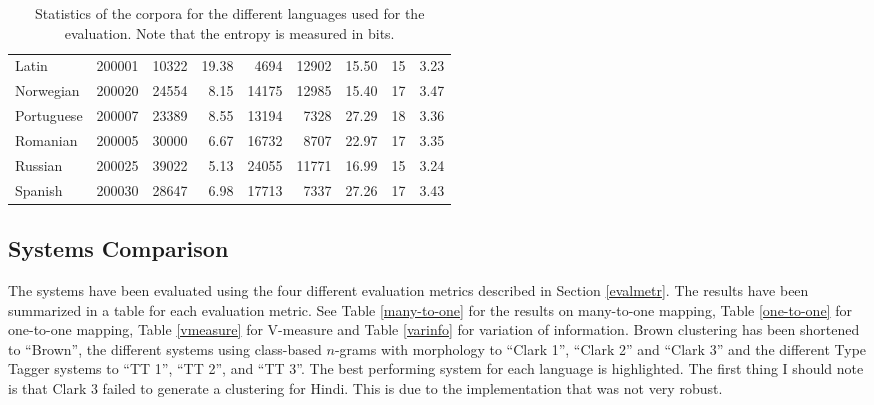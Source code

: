 \documentclass[11pt]{article}
\begin{document}
{\begin{table}
\begin{tabular}{l|r|r|r|r|r|r|r|r}
Latin&200001&10322&19.38&4694  &12902&15.50&15&3.23\\
Norwegian&200020&24554&8.15& 14175 &12985&15.40&17&3.47\\
Portuguese&200007&23389&8.55& 13194 &7328&27.29&18&3.36\\
Romanian&200005&30000&6.67& 16732 &8707&22.97&17&3.35\\
Russian&200025&39022&5.13& 24055 &11771&16.99&15&3.24\\
Spanish&200030&28647&6.98& 17713 &7337&27.26&17&3.43\\
\end{tabular}
\caption{Statistics of the corpora for the different languages used for the evaluation. Note that the entropy is measured in bits.}
\end{table}

\subsection{Systems Comparison}
The systems have been evaluated using the four different evaluation metrics described in Section \ref{evalmetr}. The results have been summarized in a table for each evaluation metric. See Table \ref{many-to-one} for the results on many-to-one mapping, Table \ref{one-to-one} for one-to-one mapping, Table \ref{vmeasure} for V-measure and Table \ref{varinfo} for variation of information. Brown clustering has been shortened to ``Brown'', the different systems using class-based $n$-grams with morphology to ``Clark 1'', ``Clark 2'' and ``Clark 3'' and the different Type Tagger systems to ``TT 1'', ``TT 2'', and ``TT 3''. The best performing system for each language is highlighted. The first thing I should note is that Clark 3 failed to generate a clustering for Hindi. This is due to the implementation that was not very robust. 

}
\end{document}
